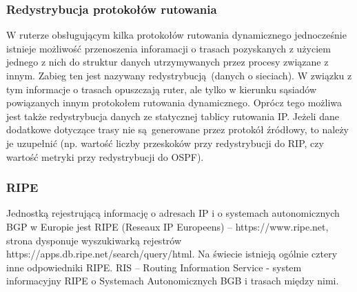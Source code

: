 \documentclass[a4paper, 12pt, titlepage]{article}
\begin{document}
			\subsubsection{Redystrybucja protokołów rutowania}
				W ruterze obsługującym kilka protokołów rutowania dynamicznego jednocześnie istnieje możliwość przenoszenia inforamacji o trasach pozyskanych z użyciem jednego z nich do struktur danych utrzymywanych przez procesy związane z innym. Zabieg ten jest nazywany redystrybucją (danych o sieciach). W związku z tym informacje o trasach opuszczają ruter, ale tylko w kierunku sąsiadów powiązanych innym protokołem rutowania dynamicznego.
				\newline \newline 
				Oprócz tego możliwa jest także redystrybucja danych ze statycznej tablicy rutowania IP.
				\newline \newline
				Jeżeli dane dodatkowe dotyczące trasy nie są generowane przez protokół źródłowy, to należy je uzupełnić (np. wartość liczby przeskoków przy redystrybucji do RIP, czy wartość metryki przy redystrybucji do OSPF).
			\subsubsection{RIPE}
				Jednostką rejestrującą informację o adresach IP i o systemach autonomicznych BGP w Europie jest RIPE (Reseaux IP Europeens) -- https://www.ripe.net, strona dysponuje wyszukiwarką rejestrów https://apps.db.ripe.net/search/query/html. Na świecie istnieją ogólnie cztery inne odpowiedniki RIPE. RIS -- Routing Information Service - system informacyjny RIPE o Systemach Autonomicznych BGB i trasach między nimi.
			
\end{document}
